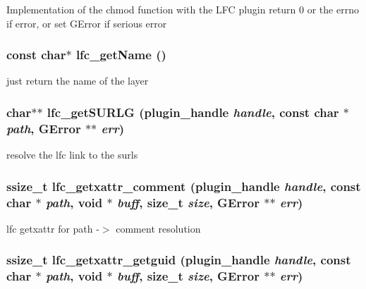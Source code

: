 Implementation of the chmod function with the LFC plugin return 0 or the errno if error, or set GError if serious error 
\subsubsection{\setlength{\rightskip}{0pt plus 5cm}const char$\ast$ lfc\_\-get\-Name ()}\label{gfal__common__lfc_8c_67715cf749ea720de31abbc67f9f414e}


just return the name of the layer 
\subsubsection{\setlength{\rightskip}{0pt plus 5cm}char$\ast$$\ast$ lfc\_\-get\-SURLG (plugin\_\-handle {\em handle}, const char $\ast$ {\em path}, GError $\ast$$\ast$ {\em err})}\label{gfal__common__lfc_8c_ab2b9f80b14228974befa9d005ea7bc9}


resolve the lfc link to the surls 
\subsubsection{\setlength{\rightskip}{0pt plus 5cm}ssize\_\-t lfc\_\-getxattr\_\-comment (plugin\_\-handle {\em handle}, const char $\ast$ {\em path}, void $\ast$ {\em buff}, size\_\-t {\em size}, GError $\ast$$\ast$ {\em err})}\label{gfal__common__lfc_8c_78bd16529e609c94b3715efe38e901a5}


lfc getxattr for path -$>$ comment resolution 
\subsubsection{\setlength{\rightskip}{0pt plus 5cm}ssize\_\-t lfc\_\-getxattr\_\-getguid (plugin\_\-handle {\em handle}, const char $\ast$ {\em path}, void $\ast$ {\em buff}, size\_\-t {\em size}, GError $\ast$$\ast$ {\em err})}\label{gfal__common__lfc_8c_264e0ecec42fb618c37740ccbf38e427}


